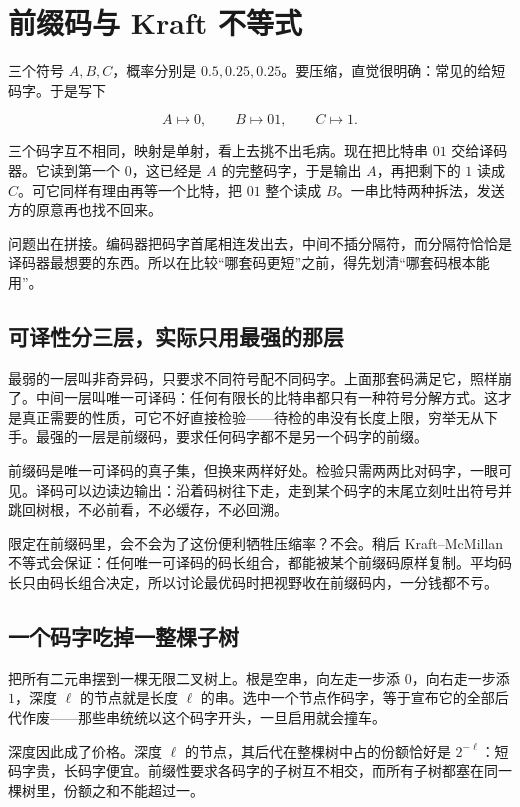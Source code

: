 \section{前缀码与 Kraft 不等式}
\label{sec:07-Information-Theory/04-Source-Coding/01}

三个符号 \(A,B,C\)，概率分别是 \(0.5,0.25,0.25\)。要压缩，直觉很明确：常见的给短码字。于是写下

\[
A\mapsto 0,\qquad B\mapsto 01,\qquad C\mapsto 1.
\]

三个码字互不相同，映射是单射，看上去挑不出毛病。现在把比特串 \(01\) 交给译码器。它读到第一个 \(0\)，这已经是 \(A\) 的完整码字，于是输出 \(A\)，再把剩下的 \(1\) 读成 \(C\)。可它同样有理由再等一个比特，把 \(01\) 整个读成 \(B\)。一串比特两种拆法，发送方的原意再也找不回来。

问题出在拼接。编码器把码字首尾相连发出去，中间不插分隔符，而分隔符恰恰是译码器最想要的东西。所以在比较``哪套码更短''之前，得先划清``哪套码根本能用''。

\subsection{可译性分三层，实际只用最强的那层}

最弱的一层叫非奇异码，只要求不同符号配不同码字。上面那套码满足它，照样崩了。中间一层叫唯一可译码：任何有限长的比特串都只有一种符号分解方式。这才是真正需要的性质，可它不好直接检验——待检的串没有长度上限，穷举无从下手。最强的一层是前缀码，要求任何码字都不是另一个码字的前缀。

前缀码是唯一可译码的真子集，但换来两样好处。检验只需两两比对码字，一眼可见。译码可以边读边输出：沿着码树往下走，走到某个码字的末尾立刻吐出符号并跳回树根，不必前看，不必缓存，不必回溯。

限定在前缀码里，会不会为了这份便利牺牲压缩率？不会。稍后 Kraft--McMillan 不等式会保证：任何唯一可译码的码长组合，都能被某个前缀码原样复制。平均码长只由码长组合决定，所以讨论最优码时把视野收在前缀码内，一分钱都不亏。

\subsection{一个码字吃掉一整棵子树}

把所有二元串摆到一棵无限二叉树上。根是空串，向左走一步添 \(0\)，向右走一步添 \(1\)，深度 \(\ell\) 的节点就是长度 \(\ell\) 的串。选中一个节点作码字，等于宣布它的全部后代作废——那些串统统以这个码字开头，一旦启用就会撞车。

深度因此成了价格。深度 \(\ell\) 的节点，其后代在整棵树中占的份额恰好是 \(2^{-\ell}\)：短码字贵，长码字便宜。前缀性要求各码字的子树互不相交，而所有子树都塞在同一棵树里，份额之和不能超过一。

